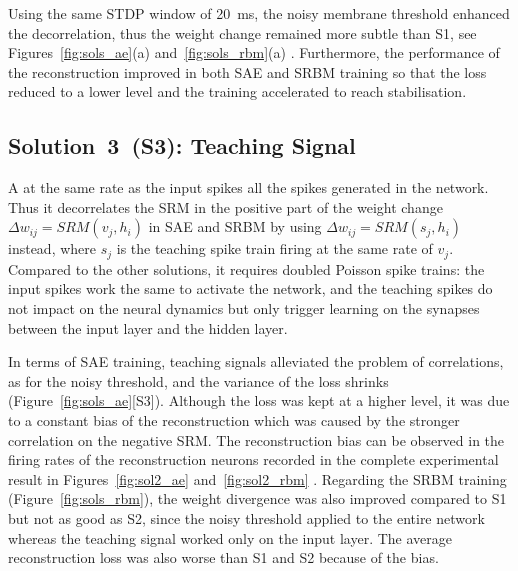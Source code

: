 Using the same STDP window \DIFdelbegin {}\DIFdelend \DIFaddbegin {}\DIFaddend of 20~ms, the noisy membrane threshold enhanced the decorrelation, thus the weight change remained more subtle than S1, see Figures~\ref{fig:sols_ae}(a) and~\ref{fig:sols_rbm}(a) .
Furthermore, the performance of the reconstruction improved in both SAE and SRBM training so that the loss reduced to a lower level and the training accelerated to reach stabilisation. %


\subsection{Solution~3~(S3): Teaching Signal}
A \DIFdelbegin {}\DIFdelend \DIFaddbegin {}\DIFaddend at the same rate as the input spikes \DIFdelbegin {}\DIFdelend \DIFaddbegin {}\DIFaddend all the spikes generated in the network.
\DIFaddbegin {}\DIFaddend Thus it decorrelates the \DIFaddbegin {}\DIFaddend SRM in the positive part of the weight change $\Delta w_{ij} = SRM(v_j,h_i)$ in SAE and SRBM by using $\Delta w_{ij}=SRM(s_j,h_i)$ instead, where $s_j$ is the teaching spike train firing at the same rate of $v_j$.
Compared to the other solutions, it requires doubled Poisson spike trains: the input spikes work the same to activate the network, and the teaching spikes do not impact on the neural dynamics but only trigger learning on the synapses between the input layer and the hidden layer.

In terms of SAE training, teaching signals alleviated the problem of correlations, as for the noisy threshold, and the variance of the loss shrinks (Figure~\ref{fig:sols_ae}[S3]).
Although the loss was kept at a higher level, it was due to a constant bias of the reconstruction which was caused by the stronger correlation on the negative SRM.
The reconstruction bias can be observed in the firing rates of the reconstruction neurons recorded in the complete experimental result in Figures~\ref{fig:sol2_ae} and~\ref{fig:sol2_rbm} \DIFdelbegin {}\DIFdelend \DIFaddbegin {}\DIFaddend .
Regarding the SRBM training (Figure~\ref{fig:sols_rbm}), the weight divergence was also improved compared to S1 but not as good as S2, since the noisy threshold applied to the entire network whereas the teaching signal worked only on the input layer.
The average reconstruction loss was also worse than S1 and S2 because of the bias. 

